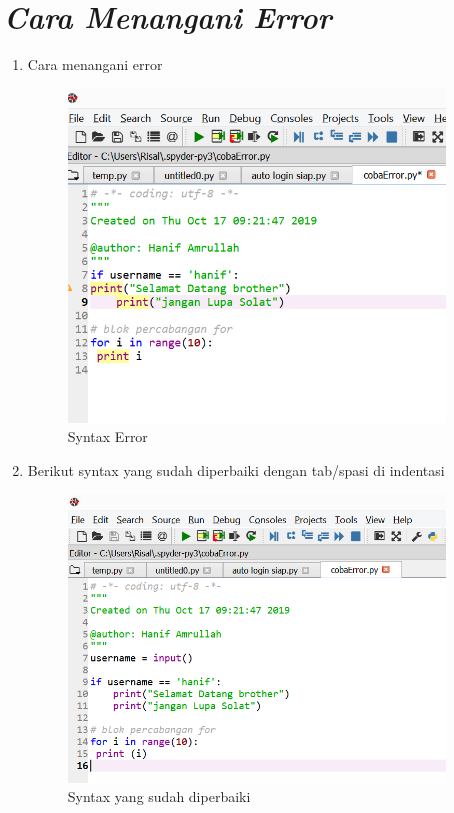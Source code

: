 \section*{\textit{Cara Menangani Error}}
\begin{enumerate}
\item Cara menangani error
		\begin{figure}[h]
			\includegraphics[width=10cm]{figure/Error4.png}
			\centering
			\caption{Syntax Error}
			\end{figure}
\item Berikut syntax yang sudah diperbaiki dengan tab/spasi di indentasi
		\begin{figure}[h]
			\includegraphics[width=10cm]{figure/Error5.png}
			\centering
			\caption{Syntax yang sudah diperbaiki}
			\end{figure}
\end{enumerate}